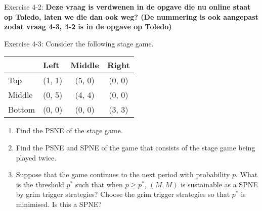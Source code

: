 \documentclass[../main.tex]{subfiles}
\begin{document}
\begin{question}
Exercise 4-2: \textbf{Deze vraag is verdwenen in de opgave die nu online staat op Toledo, laten we die dan ook weg? (De nummering is ook aangepast zodat vraag 4-3, 4-2 is in de opgave op Toledo)}
\end{question}

\begin{solution}
\end{solution}

\begin{question}

Exercise 4-3: Consider the following stage game.
\begin{table}[h]
\centering
\begin{tabular}{lccc}
                            & \multicolumn{1}{l}{Left} & \multicolumn{1}{l}{Middle} & \multicolumn{1}{l}{Right} \\ \hline
\multicolumn{1}{l|}{Top}    & (1, 1)                   & (5, 0)                     & (0, 0)                    \\
\multicolumn{1}{l|}{Middle} & (0, 5)                   & (4, 4)                     & (0, 0)                    \\
\multicolumn{1}{l|}{Bottom}  & (0, 0)                   & (0, 0)                     & (3, 3)                   
\end{tabular}
\end{table}

\begin{enumerate}
  \item Find the PSNE of the stage game.
  \item Find the PSNE and SPNE of the game that consists of the stage game being played twice.
  \item Suppose that the game continues to the next period with probability $p$. What is the threshold $p^*$ such that when $p \geq p^*$, $(M,M)$ is sustainable as a SPNE by grim trigger strategies? Choose the grim trigger strategies so that $p^*$ is minimised. Is this a SPNE?
\end{enumerate}

\end{question}
\end{document}
